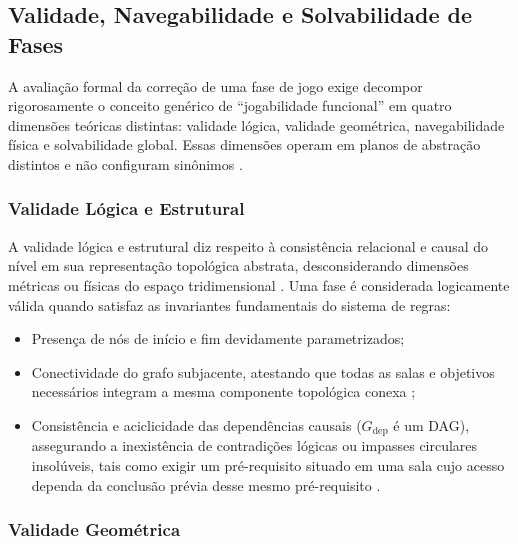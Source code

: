 \subsection{Validade, Navegabilidade e Solvabilidade de Fases}
\label{sec:validade_navegabilidade_solvabilidade}

A avaliação formal da correção de uma fase de jogo exige decompor rigorosamente o conceito genérico de ``jogabilidade funcional'' em quatro dimensões teóricas distintas: validade lógica, validade geométrica, navegabilidade física e solvabilidade global. Essas dimensões operam em planos de abstração distintos e não configuram sinônimos \cite{dormans2010, linden2013designing, linden2014dungeons, sun2024roomplanner, xu2025constraint}.

\subsubsection{Validade Lógica e Estrutural}
\label{sec:validade_logica}

A validade lógica e estrutural diz respeito à consistência relacional e causal do nível em sua representação topológica abstrata, desconsiderando dimensões métricas ou físicas do espaço tridimensional \cite{dormans2010, linden2013designing, linden2014dungeons}. Uma fase é considerada logicamente válida quando satisfaz as invariantes fundamentais do sistema de regras:
\begin{itemize}
    \item Presença de nós de início e fim devidamente parametrizados;
    \item Conectividade do grafo subjacente, atestando que todas as salas e objetivos necessários integram a mesma componente topológica conexa \cite{linden2014dungeons, xu2025databasedrivenframework3dlevel};
    \item Consistência e aciclicidade das dependências causais ($G_{\text{dep}}$ é um DAG), assegurando a inexistência de contradições lógicas ou impasses circulares insolúveis, tais como exigir um pré-requisito situado em uma sala cujo acesso dependa da conclusão prévia desse mesmo pré-requisito \cite{cormen2009introduction, dormans2010, linden2014dungeons}.
\end{itemize}

\subsubsection{Validade Geométrica}
\label{sec:validade_geometrica}

